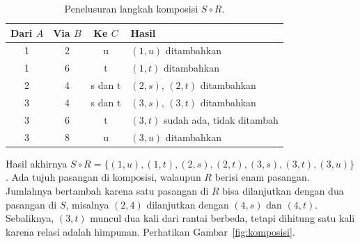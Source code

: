 \documentclass[11pt,a4paper]{article}
\begin{document}
\begin{table}[H]
	\centering
	\caption{Penelusuran langkah komposisi $S \circ R$.}
	\label{tab:komposisi-langkah}
	\small
	\begin{tabular}{c c c l}
		\toprule
		Dari $A$ & Via $B$ & Ke $C$  & Hasil                             \\
		\midrule
		1        & 2       & u       & $(1,u)$ ditambahkan               \\
		1        & 6       & t       & $(1,t)$ ditambahkan               \\
		2        & 4       & s dan t & $(2,s)$, $(2,t)$ ditambahkan      \\
		3        & 4       & s dan t & $(3,s)$, $(3,t)$ ditambahkan      \\
		3        & 6       & t       & $(3,t)$ sudah ada, tidak ditambah \\
		3        & 8       & u       & $(3,u)$ ditambahkan               \\
		\bottomrule
	\end{tabular}
\end{table}

Hasil akhirnya $S \circ R=\{(1,u),(1,t),(2,s),(2,t),(3,s),(3,t),(3,u)\}$. Ada tujuh pasangan di komposisi, walaupun $R$ berisi enam pasangan. Jumlahnya bertambah karena satu pasangan di $R$ bisa dilanjutkan dengan dua pasangan di $S$, misalnya $(2,4)$ dilanjutkan dengan $(4,s)$ dan $(4,t)$. Sebaliknya, $(3,t)$ muncul dua kali dari rantai berbeda, tetapi dihitung satu kali karena relasi adalah himpunan. Perhatikan Gambar~\ref{fig:komposisi}.
\end{document}
